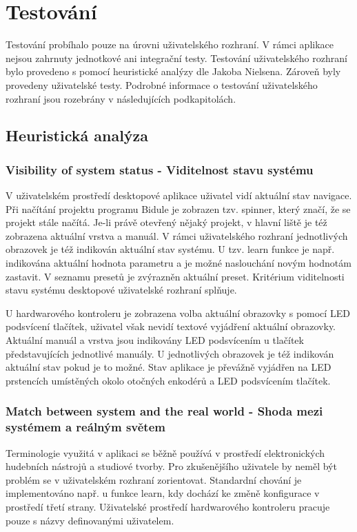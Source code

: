 \documentclass[thesis=M,czech]{FITthesis}[2019/03/06]
\begin{document}
\chapter{Testování}
	Testování probíhalo pouze na úrovni uživatelského rozhraní. V rámci aplikace nejsou zahrnuty jednotkové ani integrační testy.
	Testování uživatelského rozhraní bylo provedeno s pomocí heuristické analýzy dle Jakoba Nielsena\cite{nielsen-heuristics}. Zároveň byly provedeny uživatelské testy.
	Podrobné informace o testování uživatelského rozhraní jsou rozebrány v následujících podkapitolách.

	\section{Heuristická analýza}
		\subsection{Visibility of system status - Viditelnost stavu systému}
			V uživatelském prostředí desktopové aplikace uživatel vidí aktuální stav navigace.
			Při načítání projektu programu Bidule je zobrazen tzv. spinner,	který značí, že se projekt stále načítá.
			Je-li právě otevřený nějaký projekt, v hlavní liště je též zobrazena aktuální vrstva a manuál. 
			V rámci uživatelského rozhraní jednotlivých obrazovek je též indikován aktuální stav systému. U tzv. learn funkce je např. indikována aktuální hodnota parametru a je možné naslouchání novým hodnotám zastavit. V seznamu presetů je zvýrazněn aktuální preset.
			Kritérium viditelnosti stavu systému desktopové uživatelské rozhraní splňuje.
			
			U hardwarového kontroleru je zobrazena volba aktuální obrazovky s pomocí LED podsvícení tlačítek, uživatel však nevidí textové vyjádření aktuální obrazovky. Aktuální manuál a vrstva jsou indikovány LED podsvícením u tlačítek představujících jednotlivé manuály. U jednotlivých obrazovek je též indikován aktuální stav pokud je to možné. Stav aplikace je převážně vyjádřen na LED prstencích umístěných okolo otočných enkodérů a LED podsvícením tlačítek.			
		\subsection{Match between system and the real world - Shoda mezi systémem a reálným světem}\label{sec:heuristics-2}
			Terminologie využitá v aplikaci se běžně používá v prostředí elektronických hudebních nástrojů a studiové tvorby. Pro zkušenějšího uživatele by neměl být problém se v uživatelském rozhraní zorientovat. 
			Standardní chování je implementováno např. u funkce learn, kdy dochází ke změně konfigurace v prostředí třetí strany.
			Uživatelské prostředí hardwarového kontroleru pracuje pouze s názvy definovanými uživatelem.
			
\end{document}
